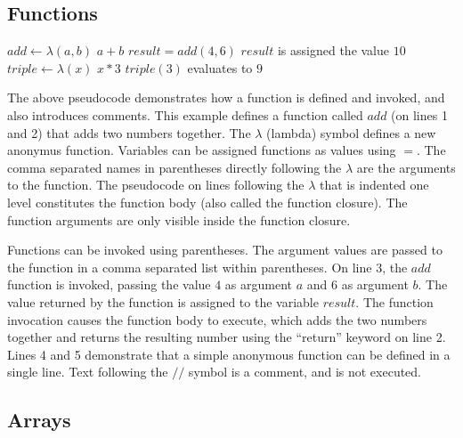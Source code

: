 \subsection{Functions}
\begin{codebox}
\li $add \gets \lambda(a, b)$
\Do
\li \Return $ a + b $
\End
\li $result = add(4, 6)$ \Comment $result$ is assigned the value $10$
\li $triple \gets \lambda(x)$ \Return $ x * 3 $
\li $triple(3)$ \Comment evaluates to $9$
\end{codebox}

The above pseudocode demonstrates how a function is defined and invoked, and also introduces comments. This example defines a function called $add$ (on lines 1 and 2) that adds two numbers together. The $\lambda$ (lambda) symbol defines a new anonymus function. Variables can be assigned functions as values using $=$. The comma separated names in parentheses directly following the $\lambda$ are the arguments to the function. The pseudocode on lines following the $\lambda$ that is indented one level constitutes the function body (also called the function closure). The function arguments are only visible inside the function closure.

Functions can be invoked using parentheses. The argument values are passed to the function in a comma separated list within parentheses. On line 3, the $add$ function is invoked, passing the value $4$ as argument $a$ and $6$ as argument $b$. The value returned by the function is assigned to the variable $result$. The function invocation causes the function body to execute, which adds the two numbers together and returns the resulting number using the ``return'' keyword on line 2. Lines 4 and 5 demonstrate that a simple anonymous function can be defined in a single line. Text following the $//$ symbol is a comment, and is not executed.

\subsection{Arrays}

